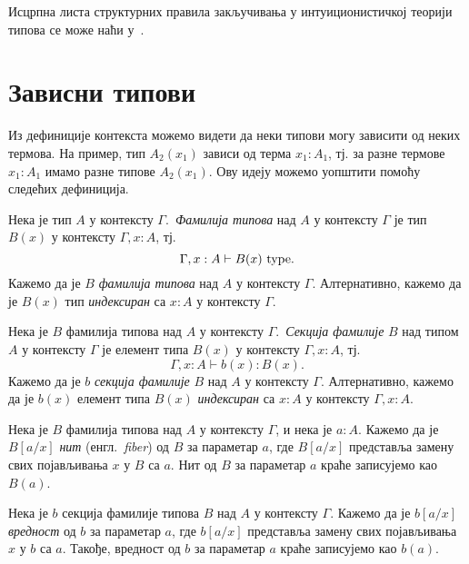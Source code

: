 \documentclass[12pt,oneside]{memoir}
\begin{document}
Исцрпна листа структурних правила закључивања у интуиционистичкој теорији типова се може наћи у~\cite{rijke2022intro}.

\section{Зависни типови}

Из дефиниције контекста можемо видети да неки типови могу зависити од неких термова. На пример, тип $A_2(x_1)$ зависи од терма $x_1 : A_1$, тј. за разне термове $x_1 : A_1$ имамо разне типове $A_2(x_1)$. Ову идеју можемо уопштити помоћу следећих дефиниција.

\begin{definition}
    Нека је тип $A$ у контексту $\Gamma$.~\emph{Фамилија типова} над $A$ у контексту $\Gamma$ је тип $B(x)$ у контексту $\Gamma, x : A$, тј.
    \[\Gamma, x : A \vdash B(x)~{\mathrm{type}}.\]
    Кажемо да је $B$ \emph{фамилија типова} над $A$ у контексту $\Gamma$. Алтернативно, кажемо да је $B(x)$ тип \emph{индексиран} са $x : A$ у контексту $\Gamma$.
\end{definition}

\begin{definition}
    Нека је $B$ фамилија типова над $A$ у контексту $\Gamma$.~\emph{Секција фамилије} $B$ над типом $A$ у контексту $\Gamma$ је елемент типа $B(x)$ у контексту $\Gamma, x : A$, тј.
    \[\Gamma, x : A \vdash b(x) : B(x).\]
    Кажемо да је $b$ \emph{секција фамилије} $B$ над $A$ у контексту $\Gamma$. Алтернативно, кажемо да је $b(x)$ елемент типа $B(x)$ \emph{индексиран} са $x : A$ у контексту $\Gamma, x : A$. 
\end{definition}

\begin{definition}
    Нека је $B$ фамилија типова над $A$ у контексту $\Gamma$, и нека је $a : A$. Кажемо да је $B[a/x]$ \emph{нит} (енгл.~\emph{fiber}) од $B$ за параметар $a$, где $B[a/x]$ представља замену свих појављивања $x$ у $B$ са $a$. Нит од $B$ за параметар $a$ краће записујемо као $B(a)$.
\end{definition}

\begin{definition}
    Нека је $b$ секција фамилије типова $B$ над $A$ у контексту $\Gamma$. Кажемо да је $b[a/x]$ \emph{вредност} од $b$ за параметар $a$, где $b[a/x]$ представља замену свих појављивања $x$ у $b$ са $a$. Такође, вредност од $b$ за параметар $a$ краће записујемо као $b(a)$.
\end{definition}
\end{document}
